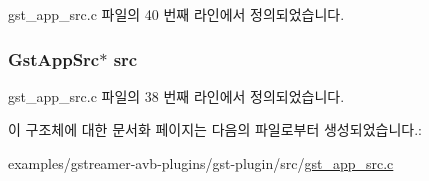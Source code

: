 gst\+\_\+app\+\_\+src.\+c 파일의 40 번째 라인에서 정의되었습니다.

\subsubsection[{\texorpdfstring{src}{src}}]{\setlength{\rightskip}{0pt plus 5cm}Gst\+App\+Src$\ast$ src}\hypertarget{structgst__app__t_a8cb2c1cd92ad959bd105b3bd2ed0c45d}{}\label{structgst__app__t_a8cb2c1cd92ad959bd105b3bd2ed0c45d}


gst\+\_\+app\+\_\+src.\+c 파일의 38 번째 라인에서 정의되었습니다.



이 구조체에 대한 문서화 페이지는 다음의 파일로부터 생성되었습니다.\+:\begin{DoxyCompactItemize}
\item 
examples/gstreamer-\/avb-\/plugins/gst-\/plugin/src/\hyperlink{gst__app__src_8c}{gst\+\_\+app\+\_\+src.\+c}\end{DoxyCompactItemize}
